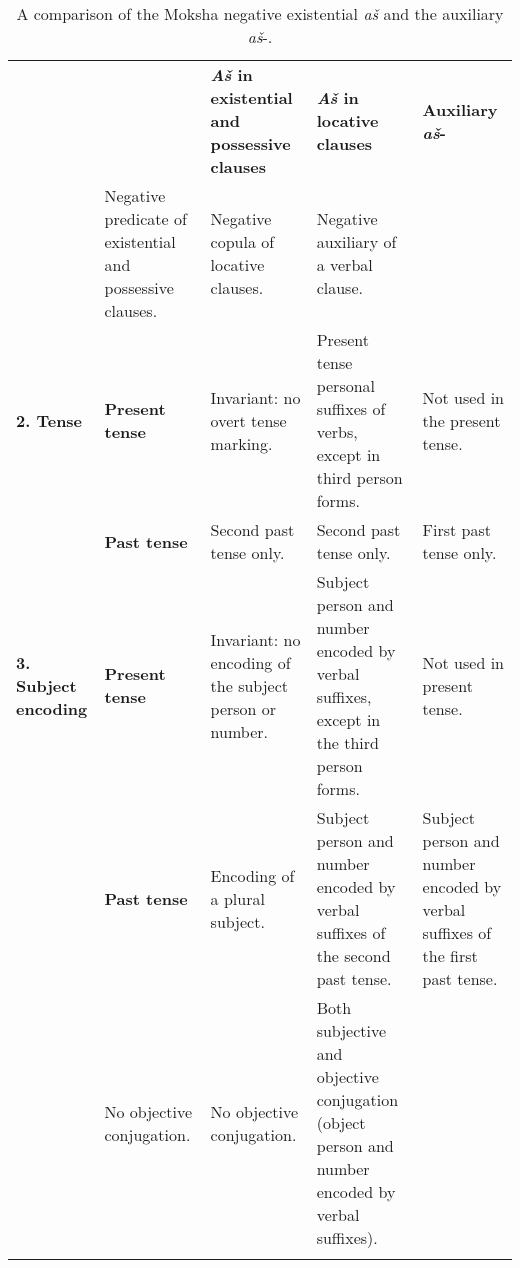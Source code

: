 \documentclass[output=paper]{langsci/langscibook}
\begin{document}
\begin{table}
\newlength{\colconj}
\newlength{\colexist}\settowidth{\colexist}{encoding of the}
\newlength{\colloc}\settowidth{\colloc}{verbal suffixes of}
\newlength{\colaux}\settowidth{\colaux}{verbal suffixes of}
\caption{A comparison of the Moksha negative existential \textit{aš} and the auxiliary \textit{aš}-.}
\label{tab:2:7}
\begin{tabularx}{\textwidth}{@{} p{\colclausfunc} p{\coltense} p{\colexist} p{\colloc} p{\colaux} @{}}
\lsptoprule
					&					&\textbf{\textit{Aš} in existential and possessive clauses}&\textbf{\textit{Aš} in locative clauses} 	&\textbf{Auxiliary \textit{aš}-}			\\
\tablevspace
\multicolumn{2}{@{} l @{}}{
\textbf{1. Clausal function}}			&Negative predicate of existential and possessive clauses.	&Negative copula of locative clauses.			&Negative auxiliary of a verbal clause.\\
\tablevspace
\textbf{2. Tense}	&\textbf{Present tense}
										& Invariant: no overt tense marking.							&Present tense personal suffixes of verbs, except in third person forms.
																																								&Not used in the present tense.		\\
					&\textbf{Past tense}
										&Second past tense only.										&Second past tense only.						&First past tense only.				\\
\tablevspace
\textbf{3. Subject encoding}
					&\textbf{Present tense}
										& Invariant: no encoding of the subject person or number. 	&Subject person and number encoded by verbal suffixes, except in the third person forms.
																																								&Not used in present tense.\\
					&\textbf{Past tense}
										&Encoding of a plural subject.									&Subject person and number encoded by verbal suffixes of the second past tense.
																																								& Subject person and number encoded by verbal suffixes of the first past tense.\\
\tablevspace
\multicolumn{2}{@{} p{\colconj} @{}}{
\textbf{4. Objective conjugation}}
										&No objective conjugation.										&No objective conjugation.						&Both subjective and objective conjugation (object person and number encoded by verbal suffixes).\\
\lspbottomrule
\end{tabularx}
\end{table}
\end{document}
